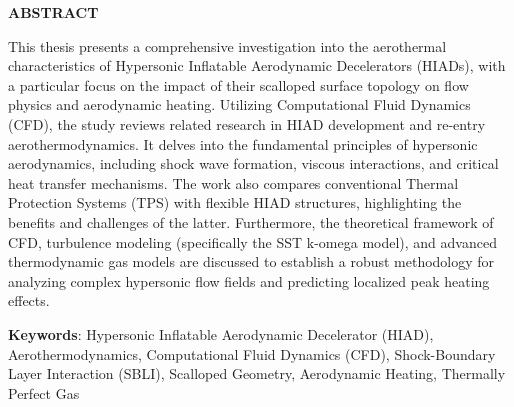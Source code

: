 \clearpage
{}
{}
\begin{center}
\textbf{\large  ABSTRACT}\\[0.5cm]
\end{center}

This thesis presents a comprehensive investigation into the aerothermal characteristics of Hypersonic Inflatable Aerodynamic Decelerators (HIADs), with a particular focus on the impact of their scalloped surface topology on flow physics and aerodynamic heating. Utilizing Computational Fluid Dynamics (CFD), the study reviews related research in HIAD development and re-entry aerothermodynamics. It delves into the fundamental principles of hypersonic aerodynamics, including shock wave formation, viscous interactions, and critical heat transfer mechanisms. The work also compares conventional Thermal Protection Systems (TPS) with flexible HIAD structures, highlighting the benefits and challenges of the latter. Furthermore, the theoretical framework of CFD, turbulence modeling (specifically the SST k-omega model), and advanced thermodynamic gas models are discussed to establish a robust methodology for analyzing complex hypersonic flow fields and predicting localized peak heating effects.




\noindent \textbf{Keywords}: Hypersonic Inflatable Aerodynamic Decelerator (HIAD), Aerothermodynamics, Computational Fluid Dynamics (CFD), Shock-Boundary Layer Interaction (SBLI), Scalloped Geometry, Aerodynamic Heating, Thermally Perfect Gas